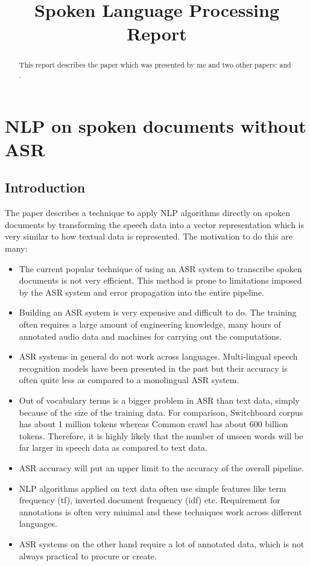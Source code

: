 \documentclass[a4paper]{article}
\title{Spoken Language Processing Report}
\begin{document}
\maketitle
%
\begin{abstract}
  This report describes the paper \cite{dredze2010nlp} which was presented by me and two other papers: \cite{li2018spoken} and \cite{rosiger2017improving}.
\end{abstract}

\section{NLP on spoken documents without ASR}
\subsection{Introduction}
The paper \cite{dredze2010nlp} describes a technique to apply NLP algorithms directly on spoken documents by transforming the speech data into a vector representation which is very similar to how textual data is represented. The motivation to do this are many:

\begin{itemize}
\item The current popular technique of using an ASR system to transcribe spoken documents is not very efficient. This method is prone to limitations imposed by the ASR system and error propagation into the entire pipeline.
\item Building an ASR system is very expensive and difficult to do. The training often requires a large amount of engineering knowledge, many hours of annotated audio data and machines for carrying out the computations.
\item ASR systems in general do not work across languages. Multi-lingual speech recognition models have been presented in the past but their accuracy is often quite less as compared to a monolingual ASR system.
\item Out of vocabulary terms is a bigger problem in ASR than text data, simply because of the size of the training data. For comparison, Switchboard corpus has about 1 million tokens whereas Common crawl has about 600 billion tokens. Therefore, it is highly likely that the number of unseen words will be far larger in speech data as compared to text data.
\item ASR accuracy will put an upper limit to the accuracy of the overall pipeline.
\item NLP algorithms applied on text data often use simple features like term frequency (tf), inverted document frequency (idf) etc. Requirement for annotations is often very minimal and these techniques work across different languages.
\item ASR systems on the other hand require a lot of annotated data, which is not always practical to procure or create.
\end{itemize}
\end{document}
